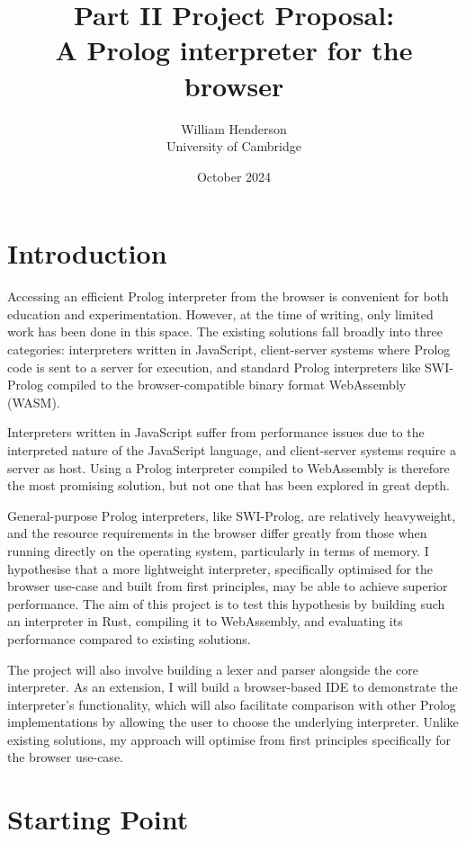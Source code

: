 \documentclass{article}
\title{Part II Project Proposal:\\
{\bf A Prolog interpreter for the browser}}
\author{William Henderson \\
University of Cambridge}
\date{October 2024}
\begin{document}
\maketitle

\section*{Introduction}

Accessing an efficient Prolog interpreter from the browser is convenient for both education and experimentation. However, at the time of writing, only limited work has been done in this space. The existing solutions fall broadly into three categories: interpreters written in JavaScript, client-server systems where Prolog code is sent to a server for execution, and standard Prolog interpreters like SWI-Prolog \cite{swiprolog} compiled to the browser-compatible binary format WebAssembly (WASM).

Interpreters written in JavaScript suffer from performance issues due to the interpreted nature of the JavaScript language, and client-server systems require a server as host. Using a Prolog interpreter compiled to WebAssembly is therefore the most promising solution, but not one that has been explored in great depth.

General-purpose Prolog interpreters, like SWI-Prolog, are relatively heavyweight, and the resource requirements in the browser differ greatly from those when running directly on the operating system, particularly in terms of memory. I hypothesise that a more lightweight interpreter, specifically optimised for the browser use-case and built from first principles, may be able to achieve superior performance. The aim of this project is to test this hypothesis by building such an interpreter in Rust, compiling it to WebAssembly, and evaluating its performance compared to existing solutions.

The project will also involve building a lexer and parser alongside the core interpreter. As an extension, I will build a browser-based IDE to demonstrate the interpreter’s functionality, which will also facilitate comparison with other Prolog implementations by allowing the user to choose the underlying interpreter. Unlike existing solutions, my approach will optimise from first principles specifically for the browser use-case.

\section*{Starting Point}
\end{document}
